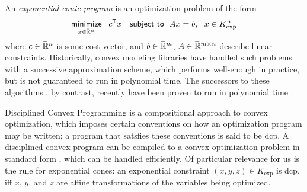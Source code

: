 \documentclass[twoside]{article}
\begin{document}
An \emph{exponential conic program} is an optimization problem of the form
\[
    \mathop{\text{\sf minimize}}\limits_{x \in \mskip1mu\overline{\mskip-1mu\mathbb R\!}\,^n}~~ c^{\sf T} x
    \quad\text{\sf subject to}~~ Ax = b,~~x \in K_{\exp}^n
\]
where $c \in \mskip1mu\overline{\mskip-1mu\mathbb R\!}\,^n$ is some cost vector, and $b \in \mskip1mu\overline{\mskip-1mu\mathbb R\!}\,^m$, $A \in \mskip1mu\overline{\mskip-1mu\mathbb R\!}\,^{m \times n}$ describe linear constraints.
Historically, convex modeling libraries have handled such problems with a successive approximation scheme, which performs well-enough in practice, but is not guaranteed to run in polynomial time.
The successors to these algorithms \parencite{dahl2022primal}, by contrast, recently have been proven to run in polynomial time \parencite{badenbroek2021algorithm}.

Disciplined Convex Programming \parencite{dcp-thesis} is a
    compositional approach to convex optimization, which imposes certain conventions on how an optimization program may be written; a program that satsfies these conventions is said to be dcp.
A disciplined convex program can be compiled to a convex optimization problem in standard form \parencite{agrawal2018rewriting}, which can be handled efficiently.
Of particular relevance for us is the rule for
exponential cones: an exponential %
constraint $(x,y,z) \in K_{\exp}$ is dcp, iff $x$, $y$, and $z$ are affine transformations of the variables being optimized.

\end{document}
